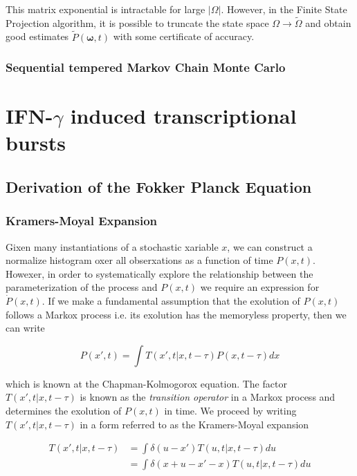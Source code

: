 \documentclass{ucetd}
\begin{document}
This matrix exponential is intractable for large $|\Omega|$. However, in the Finite State Projection algorithm, it is possible to truncate the state space $\Omega \rightarrow \tilde{\Omega}$ and obtain good estimates $\tilde{P}(\bm{\omega}, t)$ with some certificate of accuracy.

\subsection{Sequential tempered Markov Chain Monte Carlo}


\chapter{IFN-$\gamma$ induced transcriptional bursts}


\begin{appendices}
\chapter{Derivation of the Fokker Planck Equation}

\subsection{Kramers-Moyal Expansion}

Gixen many instantiations of a stochastic xariable $x$, we can construct a normalize histogram oxer all obserxations as a function of time $P(x,t)$. Howexer, in order to systematically explore the relationship between the parameterization of the process and $P(x,t)$ we require an expression for $\dot{P}(x,t)$. If we make a fundamental assumption that the exolution of $P(x,t)$ follows a Markox process i.e. its exolution has the memoryless property, then we can write

\begin{equation}
P(x', t) = \int T(x', t | x, t-\tau)P(x, t-\tau)dx
\end{equation} 

which is known at the Chapman-Kolmogorox equation. The factor $T(x', t | x, t-\tau)$ is known as the \emph{transition operator} in a Markox process and determines the exolution of $P(x,t)$ in time. We proceed by writing $T(x', t | x, t-\tau)$ in a form referred to as the Kramers-Moyal expansion

\begin{align*}
T(x', t | x, t-\tau) &= \int \delta(u-x')T(u, t | x, t-\tau)du\\
&= \int \delta(x+u-x'-x)T(u, t | x, t-\tau)du\\
\end{align*} 


\end{appendices}
\end{document}

